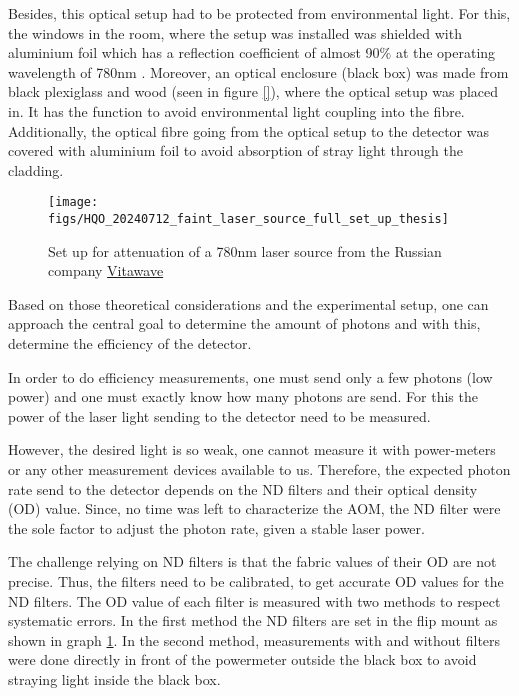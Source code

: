 Besides, this optical setup had to be protected from environmental light.
For this, the windows in the room, where the setup was installed was shielded
with aluminium foil which has a reflection coefficient of almost 90$\%$ at the operating wavelength of 780nm \cite{Alu_reflectionsgrad}.
Moreover, an optical enclosure (black box) was  made from black plexiglass and wood (seen in figure \ref{}),
where the optical setup was placed in.
It has the function to avoid environmental light coupling into the fibre.
Additionally, the optical fibre going from the optical setup to the detector was covered with aluminium foil to avoid
absorption of stray light through the cladding.\\

\begin{figure}
    \centering
    \texttt{[image: figs/HQO\_20240712\_faint\_laser\_source\_full\_set\_up\_thesis]}
    \caption{Set up for attenuation of a 780nm laser source from the Russian company \href{http://vitawave.ru/eng/}{Vitawave}}
    \label{fig: faint_laser_source_full_set_up}
\end{figure}


Based on those theoretical considerations and the experimental setup, one can approach the central goal to determine the
amount of photons and with this, determine the efficiency of the detector.

In order to do efficiency measurements, one must send only a few photons (low power) and one must
exactly know how many photons are send.
For this the power of the laser light sending to the detector need to be measured.

However, the desired light is so weak, one cannot measure it with power-meters or any other measurement devices available to us.
Therefore, the expected photon rate send to the detector depends on the ND filters and their optical density (OD) value.
Since, no time was left to characterize the AOM, the ND filter were the sole factor to adjust the photon rate, given a stable laser power.

The challenge relying on ND filters is that the fabric values of their OD are not precise.
Thus, the filters need to be calibrated, to get accurate OD values for the ND filters.
The OD value of each filter is measured with two methods to respect systematic errors.
In the first method the ND filters are set in the flip mount as shown in graph \ref{fig: faint_laser_source_full_set_up}.
In the second method, measurements with and without filters were done directly in front of the powermeter
outside the black box to avoid straying light inside the black box.

